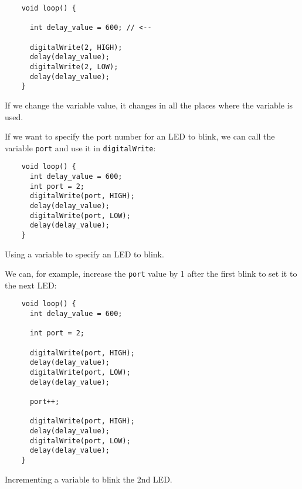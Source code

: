 \documentclass[../sparc.tex]{subfiles}
\begin{document}
\begin{listing}[ht]
  \begin{verbatim}
    void loop() {

      int delay_value = 600; // <--

      digitalWrite(2, HIGH);
      delay(delay_value);
      digitalWrite(2, LOW);
      delay(delay_value);
    }
  \end{verbatim}
  \label{listing:dialogues-with-computer-variable-set-value}
  \caption{If we change the variable value, it changes in all the places where
    the variable is used.}
\end{listing}

If we want to specify the port number for an LED to blink, we can call the
variable \texttt{port} and use it in \texttt{digitalWrite}:

\begin{listing}[ht]
  \begin{verbatim}
    void loop() {
      int delay_value = 600;
      int port = 2;
      digitalWrite(port, HIGH);
      delay(delay_value);
      digitalWrite(port, LOW);
      delay(delay_value);
    }
  \end{verbatim}
  \label{listing:dialogues-with-computer-variable-set-value}
  \caption{Using a variable to specify an LED to blink.}
\end{listing}

We can, for example, increase the \texttt{port} value by 1 after the first blink
to set it to the next LED:

\begin{listing}[ht]
  \begin{verbatim}
    void loop() {
      int delay_value = 600;

      int port = 2;

      digitalWrite(port, HIGH);
      delay(delay_value);
      digitalWrite(port, LOW);
      delay(delay_value);

      port++;

      digitalWrite(port, HIGH);
      delay(delay_value);
      digitalWrite(port, LOW);
      delay(delay_value);
    }
  \end{verbatim}
  \label{listing:dialogues-with-computer-variable-set-value}
  \caption{Incrementing a variable to blink the 2nd LED.}
\end{listing}
\end{document}
